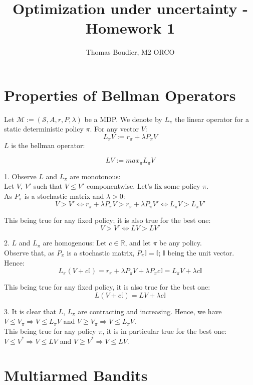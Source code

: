 \documentclass[12pt]{article}
\begin{document}
\title{Optimization under uncertainty - Homework 1}
\author{Thomas Boudier, M2 ORCO}

\maketitle

\section{Properties of Bellman Operators}

Let $\mathcal{M} := (\mathcal{S}, A, r, P, \lambda)$ be a MDP. 
We denote by $L_{\pi}$ the linear operator for a static deterministic policy $\pi$. For any vector $V$:
$$ L_{\pi} V := r_{\pi} + \lambda P_{\pi} V$$
$L$ is the bellman operator:

$$ LV := max_{\pi} L_{\pi} V$$

1. Observe $L$ and $L_{\pi}$ are monotonous: \\
Let $V$, $V'$ such that $V \le V'$ componentwise. Let's fix some policy $\pi$.\\As $P_{\pi}$ is a stochastic matrix and $\lambda > 0$:
$$V > V' \Leftrightarrow r_{\pi} +\lambda P_{\pi} V > r_{\pi} + \lambda P_{\pi} V'  \Leftrightarrow L_{\pi} V > L_{\pi}V'$$

This being true for any fixed policy; it is also true for the best one: $$V > V' \Leftrightarrow LV > LV'$$

2. $L$ and $L_{\pi}$ are homogenous:
Let $c \in  \mathbb{R}$, and let $\pi$ be any policy. \\
Observe that, as $P_{\pi}$ is a stochastic matrix, $P_{\pi} \mathbb{I} = \mathbb{I}$; $\mathbb{I}$ being the unit vector. 
Hence: 
$$ L_{\pi} (V + c\mathbb{I}) = r_{\pi} + \lambda P_{\pi} V + \lambda P_{\pi} c \mathbb{I} = L_{\pi} V + \lambda c \mathbb{I} $$

This being true for any fixed policy, it is also true for the best one: $$ L(V + c\mathbb{I}) = LV + \lambda c \mathbb{I} $$ 

3.  It is clear that $L$, $L_{\pi}$ are contracting and increasing. Hence, we have $V\le V_{\pi} \Rightarrow V \le L_{\pi}V$ and $V \ge V_{\pi}  \Rightarrow V \le L_{\pi}V$. \\
This being true for any policy $\pi$, it is in particular true for the best one: $V\le V^* \Rightarrow V \le LV$ and $V \ge V^*  \Rightarrow V \le LV.$

\section{Multiarmed Bandits}
\end{document}
